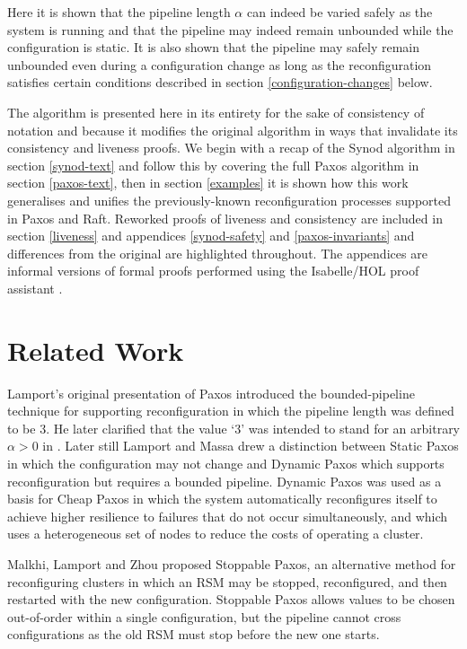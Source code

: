 \documentclass[journal]{IEEEtran}
\begin{document}
Here it is shown that the pipeline length $\alpha$ can indeed be varied safely
as the system is running and that the pipeline may indeed remain unbounded
while the configuration is static. It is also shown that the pipeline may
safely remain unbounded even during a configuration change as long as the
reconfiguration satisfies certain conditions described in section
\ref{configuration-changes} below.

The algorithm is presented here in its entirety for the sake of consistency of
notation and because it modifies the original algorithm in ways that invalidate
its consistency and liveness proofs.  We begin with a recap of the Synod
algorithm in section \ref{synod-text} and follow this by covering the full
Paxos algorithm in section \ref{paxos-text}, then in section
\ref{examples} it is shown how this work generalises and
unifies the previously-known reconfiguration processes supported in Paxos and
Raft. Reworked proofs of liveness and consistency are included in section
\ref{liveness} and appendices \ref{synod-safety} and \ref{paxos-invariants} and
differences from the original are highlighted throughout. The appendices are
informal versions of formal proofs performed using the Isabelle/HOL proof
assistant \cite{isabelle-hol}.


\section{Related Work}

Lamport's original presentation of Paxos \cite{part-time-parliament} introduced
the bounded-pipeline technique for supporting reconfiguration in which the
pipeline length was defined to be 3. He later clarified that the value `3' was
intended to stand for an arbitrary $\alpha > 0$ in \cite{paxos-made-simple}.
Later still Lamport and Massa \cite{cheap-paxos} drew a distinction between
Static Paxos in which the configuration may not change and Dynamic Paxos which
supports reconfiguration but requires a bounded pipeline.  Dynamic Paxos was
used as a basis for Cheap Paxos in which the system automatically reconfigures
itself to achieve higher resilience to failures that do not occur
simultaneously, and which uses a heterogeneous set of nodes to reduce the costs
of operating a cluster.

Malkhi, Lamport and Zhou \cite{stoppable-paxos} proposed Stoppable Paxos, an
alternative method for reconfiguring clusters in which an RSM may be stopped,
reconfigured, and then restarted with the new configuration. Stoppable Paxos
allows values to be chosen out-of-order within a single configuration, but the
pipeline cannot cross configurations as the old RSM must stop before the new
one starts.
\end{document}
